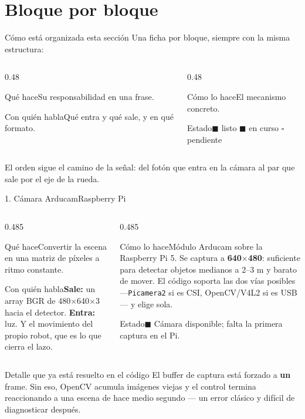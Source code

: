 \documentclass[aspectratio=169,10pt]{beamer}
\newcommand{\listo}{\textcolor{verde}{$\blacksquare$}}
\newcommand{\curso}{\textcolor{ambar}{$\blacksquare$}}
\newcommand{\pend}{\textcolor{grisclaro}{$\square$}}
\newcommand{\ficha}[4]{%
  {\footnotesize
  \begin{columns}[T,onlytextwidth]
    \begin{column}{0.485\textwidth}
      \begin{block}{Qué hace}#1\end{block}
      \begin{block}{Con quién habla}#3\end{block}
    \end{column}
    \begin{column}{0.485\textwidth}
      \begin{block}{Cómo lo hace}#2\end{block}
      \begin{block}{Estado}#4\end{block}
    \end{column}
  \end{columns}}}
\begin{document}
\section{Bloque por bloque}

\begin{frame}{Cómo está organizada esta sección}
  Una ficha por bloque, siempre con la misma estructura:

  \vspace{0.6em}
  \begin{columns}[T,onlytextwidth]
    \begin{column}{0.48\textwidth}
      \begin{block}{Qué hace}Su responsabilidad en una frase.\end{block}
      \begin{block}{Con quién habla}Qué entra y qué sale, y en qué formato.\end{block}
    \end{column}
    \begin{column}{0.48\textwidth}
      \begin{block}{Cómo lo hace}El mecanismo concreto.\end{block}
      \begin{block}{Estado}\listo{} listo \quad \curso{} en curso \quad \pend{} pendiente\end{block}
    \end{column}
  \end{columns}

  \vspace{0.8em}
  \small
  El orden sigue el camino de la señal: del fotón que entra en la cámara al par
  que sale por el eje de la rueda.
\end{frame}

\begin{frame}{1. Cámara Arducam\hfill{\small\mdseries Raspberry Pi}}
  \ficha
  {Convertir la escena en una matriz de píxeles a ritmo constante.}
  {Módulo Arducam sobre la Raspberry Pi 5. Se captura a \textbf{640$\times$480}:
   suficiente para detectar objetos medianos a 2--3 m y barato de mover.
   El código soporta las dos vías posibles ---\texttt{Picamera2} si es CSI,
   OpenCV/V4L2 si es USB--- y elige sola.}
  {\textbf{Sale:} un array BGR de 480$\times$640$\times$3 hacia el detector.
   \textbf{Entra:} luz. Y el movimiento del propio robot, que es lo que cierra
   el lazo.}
  {\curso{} Cámara disponible; falta la primera captura en el Pi.}

  \vspace{0.5em}
  \small
  \begin{alertblock}{Detalle que ya está resuelto en el código}
    El buffer de captura está forzado a \textbf{un} frame. Sin eso, OpenCV
    acumula imágenes viejas y el control termina reaccionando a una escena de
    hace medio segundo --- un error clásico y difícil de diagnosticar después.
  \end{alertblock}
\end{frame}
\end{document}
